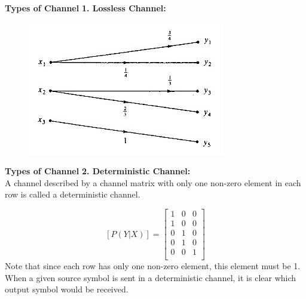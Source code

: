 \documentclass[a4]{beamer}
\begin{document}
\noindent \textbf{Types of Channel}
\textbf{ 1. Lossless Channel:}\\

\begin{figure}
\centering
\includegraphics[width=0.7\linewidth]{./11Blossless}
\caption{}
\label{fig:11Blossless}
\end{figure}





\noindent \textbf{Types of Channel}
\textbf{2. Deterministic Channel:}\\
A channel described by a channel matrix with only one non-zero element in each row is called a deterministic channel.

\[  [P(Y|X)]  =  \left[ \begin{array}{ccc}
1   & 0 &0 \\
1  & 0 &0\\
0  & 1 &0\\
0  & 1& 0 \\
0  & 0& 1 \\
\end{array} \right]  \]
Note that since each row has only one non-zero element, this element must be 1. When a given source symbol is sent in a deterministic channel, it is clear which output symbol would be received.


\end{document}
